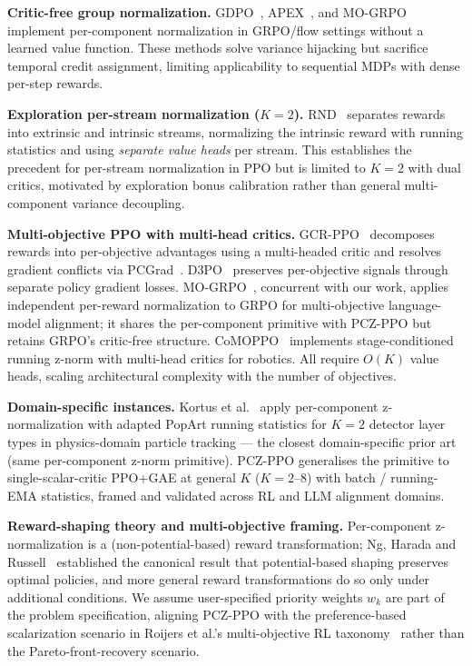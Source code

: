 \documentclass[11pt,a4paper]{article}
\begin{document}
\textbf{Critic-free group normalization.}
GDPO~\cite{shao2024gdpo}, APEX~\cite{apex2024}, and MO-GRPO~\cite{mogrpo2024} implement per-component normalization in GRPO/flow settings without a learned value function. These methods solve variance hijacking but sacrifice temporal credit assignment, limiting applicability to sequential MDPs with dense per-step rewards.

\textbf{Exploration per-stream normalization ($K{=}2$).}
RND~\cite{burda2018rnd} separates rewards into extrinsic and intrinsic streams, normalizing the intrinsic reward with running statistics and using \emph{separate value heads} per stream. This establishes the precedent for per-stream normalization in PPO but is limited to $K{=}2$ with dual critics, motivated by exploration bonus calibration rather than general multi-component variance decoupling.

\textbf{Multi-objective PPO with multi-head critics.}
GCR-PPO~\cite{gcrppo2025} decomposes rewards into per-objective advantages using a multi-headed critic and resolves gradient conflicts via PCGrad~\cite{yu2020pcgrad}. D3PO~\cite{d3po2026} preserves per-objective signals through separate policy gradient losses. MO-GRPO~\cite{mogrpo2024}, concurrent with our work, applies independent per-reward normalization to GRPO for multi-objective language-model alignment; it shares the per-component primitive with PCZ-PPO but retains GRPO's critic-free structure. CoMOPPO~\cite{kim2024comoppo} implements stage-conditioned running z-norm with multi-head critics for robotics. All require $O(K)$ value heads, scaling architectural complexity with the number of objectives.

\textbf{Domain-specific instances.}
Kortus et al.~\cite{kortus2023tracking,kortus2025constrained} apply per-component z-normalization with adapted PopArt running statistics for $K{=}2$ detector layer types in physics-domain particle tracking --- the closest domain-specific prior art (same per-component z-norm primitive). PCZ-PPO generalises the primitive to single-scalar-critic PPO+GAE at general $K$ ($K{=}2$--$8$) with batch / running-EMA statistics, framed and validated across RL and LLM alignment domains.

\textbf{Reward-shaping theory and multi-objective framing.}
Per-component z-normalization is a (non-potential-based) reward transformation; Ng, Harada and Russell~\cite{ng1999rewardshaping} established the canonical result that potential-based shaping preserves optimal policies, and more general reward transformations do so only under additional conditions. We assume user-specified priority weights $w_k$ are part of the problem specification, aligning PCZ-PPO with the preference-based scalarization scenario in Roijers et al.'s multi-objective RL taxonomy~\cite{roijers2013morl} rather than the Pareto-front-recovery scenario.
\end{document}
